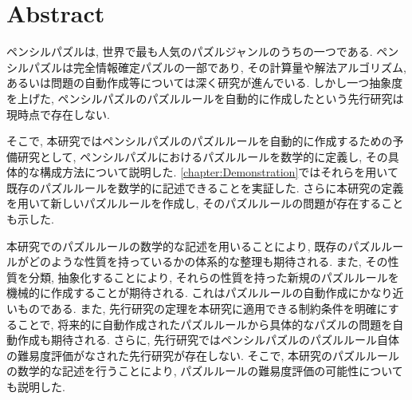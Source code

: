\chapter*{{\rm \bf Abstract}}\label{chapter:Abstract}
ペンシルパズルは, 世界で最も人気のパズルジャンルのうちの一つである. ペンシルパズルは完全情報確定パズルの一部であり, その計算量や解法アルゴリズム, あるいは問題の自動作成等については深く研究が進んでいる. しかし一つ抽象度を上げた, ペンシルパズルのパズルルールを自動的に作成したという先行研究は現時点で存在しない.

そこで, 本研究ではペンシルパズルのパズルルールを自動的に作成するための予備研究として, ペンシルパズルにおけるパズルルールを数学的に定義し, その具体的な構成方法について説明した. \cref{chapter:Demonstration}ではそれらを用いて既存のパズルルールを数学的に記述できることを実証した. さらに本研究の定義を用いて新しいパズルルールを作成し, そのパズルルールの問題が存在することも示した.

本研究でのパズルルールの数学的な記述を用いることにより, 既存のパズルルールがどのような性質を持っているかの体系的な整理も期待される. また, その性質を分類, 抽象化することにより, それらの性質を持った新規のパズルルールを機械的に作成することが期待される. これはパズルルールの自動作成にかなり近いものである. また, 先行研究の定理を本研究に適用できる制約条件を明確にすることで, 将来的に自動作成されたパズルルールから具体的なパズルの問題を自動作成も期待される. さらに, 先行研究ではペンシルパズルのパズルルール自体の難易度評価がなされた先行研究が存在しない. そこで, 本研究のパズルルールの数学的な記述を行うことにより, パズルルールの難易度評価の可能性についても説明した.